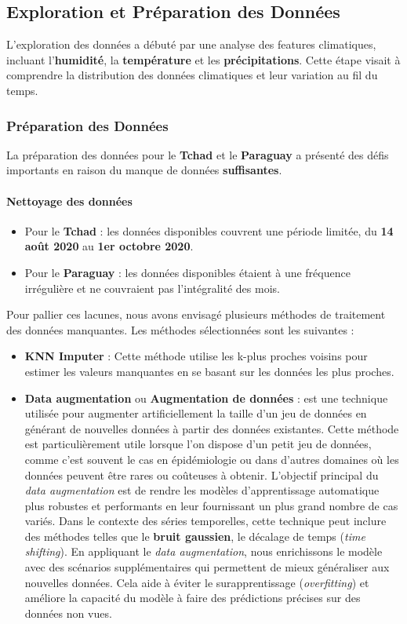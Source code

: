 \subsection{Exploration et Préparation des Données}
L'exploration des données a débuté par une analyse des features climatiques, incluant l'\textbf{humidité}, la \textbf{température} et les \textbf{précipitations}. Cette étape visait à comprendre la distribution des données climatiques et leur variation au fil du temps.
\subsubsection{Préparation des Données}
La préparation des données pour le \textbf{Tchad} et le \textbf{Paraguay} a présenté des défis importants en raison du manque de données \textbf{suffisantes}.

\paragraph*{Nettoyage des données}
\begin{itemize}
	\item Pour le \textbf{Tchad} : les données disponibles couvrent une période limitée, du \textbf{14 août 2020} au \textbf{1er octobre 2020}.
	\item Pour le \textbf{Paraguay} : les données disponibles étaient à une fréquence irrégulière et ne couvraient pas l'intégralité des mois.
\end{itemize}

Pour pallier ces lacunes, nous avons envisagé plusieurs méthodes de traitement des données manquantes. Les méthodes sélectionnées sont les suivantes :

\begin{itemize}
	\item \textbf{KNN Imputer} : Cette méthode utilise les k-plus proches voisins pour estimer les valeurs manquantes en se basant sur les données les plus proches.
	\item \textbf{Data  augmentation} ou \textbf{Augmentation de données} : est une technique utilisée pour augmenter artificiellement la taille d'un jeu de données en générant de nouvelles données à partir des données existantes. Cette méthode est particulièrement utile lorsque l'on dispose d'un petit jeu de données, comme c'est souvent le cas en épidémiologie ou dans d'autres domaines où les données peuvent être rares ou coûteuses à obtenir.	
	L'objectif principal du \textit{data augmentation} est de rendre les modèles d'apprentissage automatique plus robustes et performants en leur fournissant un plus grand nombre de cas variés. Dans le contexte des séries temporelles, cette technique peut inclure des méthodes telles que le \textbf{bruit gaussien}, le décalage de temps (\textit{time shifting}).
	En appliquant le \textit{data augmentation}, nous enrichissons le modèle avec des scénarios supplémentaires qui permettent de mieux généraliser aux nouvelles données. Cela aide à éviter le surapprentissage (\textit{overfitting}) et améliore la capacité du modèle à faire des prédictions précises sur des données non vues.
\end{itemize}
\newpage
